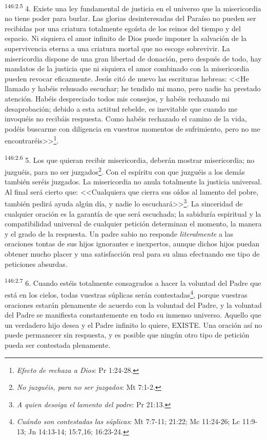 \par 
\textsuperscript{146:2.5} 4. Existe una ley fundamental de justicia en el universo que la misericordia no tiene poder para burlar. Las glorias desinteresadas del Paraíso no pueden ser recibidas por una criatura totalmente egoísta de los reinos del tiempo y del espacio. Ni siquiera el amor infinito de Dios puede imponer la salvación de la supervivencia eterna a una criatura mortal que no escoge sobrevivir. La misericordia dispone de una gran libertad de donación, pero después de todo, hay mandatos de la justicia que ni siquiera el amor combinado con la misericordia pueden revocar eficazmente. Jesús citó de nuevo las escrituras hebreas: <<He llamado y habéis rehusado escuchar; he tendido mi mano, pero nadie ha prestado atención. Habéis despreciado todos mis consejos, y habéis rechazado mi desaprobación; debido a esta actitud rebelde, es inevitable que cuando me invoquéis no recibáis respuesta. Como habéis rechazado el camino de la vida, podéis buscarme con diligencia en vuestros momentos de sufrimiento, pero no me encontraréis>>\footnote{\textit{Efecto de rechaza a Dios}: Pr 1:24-28.}.

\par 
\textsuperscript{146:2.6} 5. Los que quieran recibir misericordia, deberán mostrar misericordia; no juzguéis, para no ser juzgados\footnote{\textit{No juzguéis, para no ser juzgados}: Mt 7:1-2.}. Con el espíritu con que juzguéis a los demás también seréis juzgados. La misericordia no anula totalmente la justicia universal. Al final será cierto que: <<Cualquiera que cierra sus oídos al lamento del pobre, también pedirá ayuda algún día, y nadie lo escuchará>>\footnote{\textit{A quien desoiga el lamento del podre}: Pr 21:13.}. La sinceridad de cualquier oración es la garantía de que será escuchada; la sabiduría espiritual y la compatibilidad universal de cualquier petición determinan el momento, la manera y el grado de la respuesta. Un padre sabio no responde \textit{literalmente} a las oraciones tontas de sus hijos ignorantes e inexpertos, aunque dichos hijos puedan obtener mucho placer y una satisfacción real para su alma efectuando ese tipo de peticiones absurdas.

\par 
\textsuperscript{146:2.7} 6. Cuando estéis totalmente consagrados a hacer la voluntad del Padre que está en los cielos, todas vuestras súplicas serán contestadas\footnote{\textit{Cuándo son contestadas las súplicas}: Mt 7:7-11; 21:22; Mc 11:24-26; Lc 11:9-13; Jn 14:13-14; 15:7,16; 16:23-24.}, porque vuestras oraciones estarán plenamente de acuerdo con la voluntad del Padre, y la voluntad del Padre se manifiesta constantemente en todo su inmenso universo. Aquello que un verdadero hijo desea y el Padre infinito lo quiere, EXISTE. Una oración así no puede permanecer sin respuesta, y es posible que ningún otro tipo de petición pueda ser contestada plenamente.


